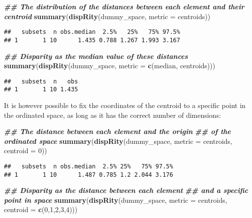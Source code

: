\documentclass[
]{book}
\newenvironment{Shaded}{\begin{snugshade}}{\end{snugshade}}
\newcommand{\AttributeTok}[1]{\textcolor[rgb]{0.13,0.29,0.53}{#1}}
\newcommand{\DecValTok}[1]{\textcolor[rgb]{0.00,0.00,0.81}{#1}}
\newcommand{\DocumentationTok}[1]{\textcolor[rgb]{0.56,0.35,0.01}{\textbf{\textit{#1}}}}
\newcommand{\FunctionTok}[1]{\textcolor[rgb]{0.13,0.29,0.53}{\textbf{#1}}}
\newcommand{\NormalTok}[1]{#1}
\begin{document}
\begin{Shaded}
\begin{Highlighting}[]
\DocumentationTok{\#\# The distribution of the distances between each element and their centroid}
\FunctionTok{summary}\NormalTok{(}\FunctionTok{dispRity}\NormalTok{(dummy\_space, }\AttributeTok{metric =}\NormalTok{ centroids))}
\end{Highlighting}
\end{Shaded}

\begin{verbatim}
##   subsets  n obs.median  2.5%   25%   75% 97.5%
## 1       1 10      1.435 0.788 1.267 1.993 3.167
\end{verbatim}

\begin{Shaded}
\begin{Highlighting}[]
\DocumentationTok{\#\# Disparity as the median value of these distances}
\FunctionTok{summary}\NormalTok{(}\FunctionTok{dispRity}\NormalTok{(dummy\_space, }\AttributeTok{metric =} \FunctionTok{c}\NormalTok{(median, centroids)))}
\end{Highlighting}
\end{Shaded}

\begin{verbatim}
##   subsets  n   obs
## 1       1 10 1.435
\end{verbatim}

It is however possible to fix the coordinates of the centroid to a specific point in the ordinated space, as long as it has the correct number of dimensions:

\begin{Shaded}
\begin{Highlighting}[]
\DocumentationTok{\#\# The distance between each element and the origin}
\DocumentationTok{\#\# of the ordinated space}
\FunctionTok{summary}\NormalTok{(}\FunctionTok{dispRity}\NormalTok{(dummy\_space, }\AttributeTok{metric =}\NormalTok{ centroids, }\AttributeTok{centroid =} \DecValTok{0}\NormalTok{))}
\end{Highlighting}
\end{Shaded}

\begin{verbatim}
##   subsets  n obs.median  2.5% 25%   75% 97.5%
## 1       1 10      1.487 0.785 1.2 2.044 3.176
\end{verbatim}

\begin{Shaded}
\begin{Highlighting}[]
\DocumentationTok{\#\# Disparity as the distance between each element}
\DocumentationTok{\#\# and a specific point in space}
\FunctionTok{summary}\NormalTok{(}\FunctionTok{dispRity}\NormalTok{(dummy\_space, }\AttributeTok{metric =}\NormalTok{ centroids,}
                 \AttributeTok{centroid =} \FunctionTok{c}\NormalTok{(}\DecValTok{0}\NormalTok{,}\DecValTok{1}\NormalTok{,}\DecValTok{2}\NormalTok{,}\DecValTok{3}\NormalTok{,}\DecValTok{4}\NormalTok{)))}
\end{Highlighting}
\end{Shaded}
\end{document}
